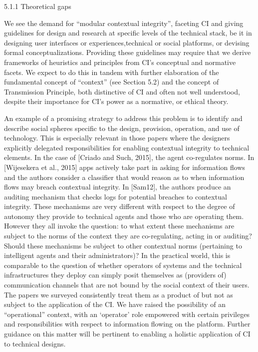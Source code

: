 \documentclass[../thesis.tex]{subfiles}
\begin{document}
{\color[rgb]{0.2627451,0.2627451,0.2627451}
5.1.1 Theoretical gaps}

We see the demand for ``modular contextual
integrity'', faceting CI and giving guidelines for
design and research at specific levels of the technical stack, be it in
designing user interfaces or experiences,technical or social platforms,
or devising formal conceptualizations. Providing these guidelines may
require that we derive frameworks of heuristics and principles from
CI's conceptual and normative facets. We expect to do
this in tandem with further elaboration of the fundamental concept of
``context'' (see Section 5.2) and
the concept of Transmission Principle, both distinctive of CI and often
not well understood, despite their importance for CI's
power as a normative, or ethical theory. 

An example of a promising strategy to address this problem is to
identify and describe social spheres specific to the design, provision,
operation, and use of technology. This is especially relevant in those
papers where the designers explicitly delegated responsibilities for
enabling contextual integrity to technical elements. In the case of
[Criado and Such, 2015], the agent co-regulates norms. In [Wijesekera
et al., 2015] apps actively take part in asking for information flows
and the authors consider a classifier that would reason as to when
information flows may breach contextual integrity. In [Sam12], the
authors produce an auditing mechanism that checks logs for potential
breaches to contextual integrity. These mechanisms are very different
with respect to the degree of autonomy they provide to technical agents
and those who are operating them. However they all invoke the question:
to what extent these mechanisms are subject to the norms of the context
they are co-regulating, acting in or auditing? Should these mechanisms
be subject to other contextual norms (pertaining to intelligent agents
and their administrators)? In the practical world, this is comparable
to the question of whether operators of systems and the technical
infrastructures they deploy can simply posit themselves as (providers
of) communication channels that are not bound by the social context of
their users. The papers we surveyed consistently treat them as a
product of but not as subject to the application of the CI. We have
raised the possibility of an
``operational'' context, with an
{\textquoteleft}operator' role empowered with certain
privileges and responsibilities with respect to information flowing on
the platform. Further guidance on this matter will be pertinent to
enabling a holistic application of CI to technical designs.
\end{document}
